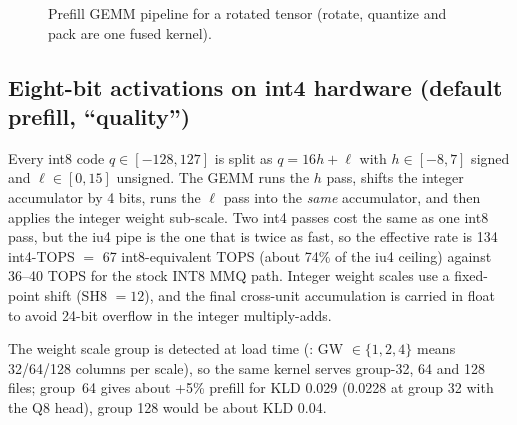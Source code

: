 \documentclass[10pt,a4paper]{article}
\newcommand{\tx}[1]{\texttt{\detokenize{#1}}}
\newcommand{\X}{\mathbf{x}}
\newcommand{\HD}{\mathbf{R}}
\begin{document}
\begin{figure}[H]
\centering
{}
\caption{Prefill GEMM pipeline for a rotated tensor (rotate, quantize and pack are one fused kernel).}
\end{figure}

\subsection{Eight-bit activations on int4 hardware (default prefill, ``quality'')}
Every int8 code $q\in[-128,127]$ is split as $q=16h+\ell$ with $h\in[-8,7]$ signed and $\ell\in[0,15]$ unsigned. The GEMM
runs the $h$ pass, shifts the integer accumulator by 4 bits, runs the $\ell$ pass into the \emph{same} accumulator, and then
applies the integer weight sub-scale. Two int4 passes cost the same as one int8 pass, but the iu4 pipe is the one that is twice
as fast, so the effective rate is 134 int4-TOPS $=$ 67 int8-equivalent TOPS (about 74\% of the iu4 ceiling) against 36--40 TOPS
for the stock INT8 MMQ path. Integer weight scales use a fixed-point shift (SH8 $=12$), and the final cross-unit accumulation is
carried in float to avoid 24-bit overflow in the integer multiply-adds.

The weight scale group is detected at load time (\tx{k_detect_gw}: GW $\in\{1,2,4\}$ means 32/64/128 columns per scale), so
the same kernel serves group-32, 64 and 128 files; group~64 gives about +5\% prefill for KLD 0.029 (0.0228 at group 32 with
the Q8 head), group 128 would be about KLD 0.04.
\end{document}
